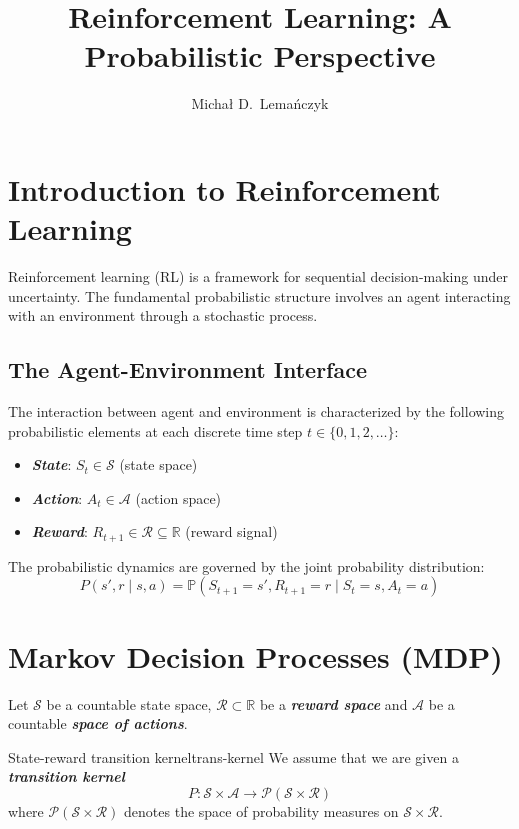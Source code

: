 \documentclass[a4paper, 11pt]{article}
\title{Reinforcement Learning: A Probabilistic Perspective}
\author{Micha\l{} D.\ Lema\'{n}czyk}
\date{}
\numberwithin{equation}{section}
\theoremstyle{plain}
\theoremstyle{definition}
\renewcommand{\P}{\mathbb{P}}
\newcommand{\1}{{\mathbbm 1}}
\newcommand{\mc}[1]{\mathcal{#1}}
\newcommand{\bi}[1]{\textbf{\textit{#1}}}
\newcommand{\R}{{\mathbb{R}}}
\begin{document}
	\maketitle
	\tableofcontents
	
	\section{Introduction to Reinforcement Learning}
	
	Reinforcement learning (RL) is a framework for sequential decision-making under uncertainty. The fundamental probabilistic structure involves an agent interacting with an environment through a stochastic process.
	
	\subsection{The Agent-Environment Interface}
	
	The interaction between agent and environment is characterized by the following probabilistic elements at each discrete time step $t \in \{0, 1, 2, \ldots\}$:
	
	\begin{itemize}
		\item \bi{State}: $S_t \in \mc{S}$ (state space)
		\item \bi{Action}: $A_t \in \mc{A}$ (action space)
		\item \bi{Reward}: $R_{t+1} \in \mc{R} \subseteq \R$ (reward signal)
	\end{itemize}
	
	The probabilistic dynamics are governed by the joint probability distribution:
	\begin{equation}
		P(s', r \;|\; s, a) = \P(S_{t+1} = s', R_{t+1} = r \;|\; S_t = s, A_t = a)
	\end{equation}
	
	\section{Markov Decision Processes (MDP)}
	
	Let $\mc{S}$ be a countable state space, $\mc{R} \subset \R$ be a \bi{reward space} and $\mc{A}$ be a countable \bi{space of actions}.
	
	\begin{fdefi}{State-reward transition kernel}{trans-kernel}
		We assume that we are given a \bi{transition kernel}
		\begin{equation}
			P: \mc{S} \times \mc{A} \to \mc{P}(\mc{S} \times \mc{R})
		\end{equation}
		where $\mc{P}(\mc{S} \times \mc{R})$ denotes the space of probability measures on $\mc{S} \times \mc{R}$.
	\end{fdefi}
	
\end{document}
